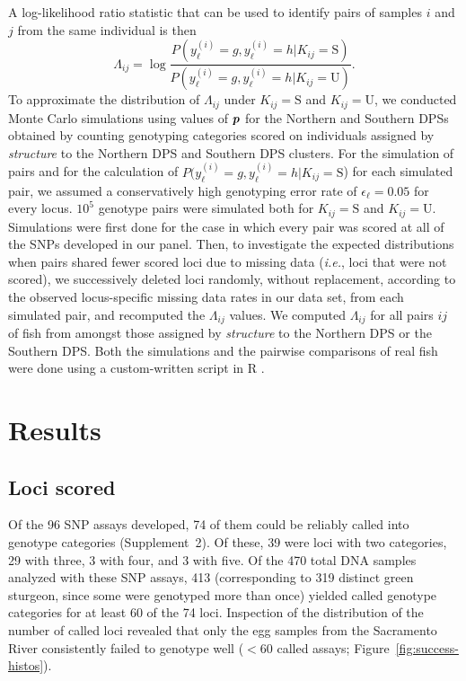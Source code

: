 \documentclass[twocolumn,natbib]{svjour3}       %
\def\bm#1{\mathpalette\bmstyle{#1}}
\def\bmstyle#1#2{\mbox{\boldmath$#1#2$}}
\newcommand{\ie}{{\em i.e.},\xspace }
\newcommand{\bp}{\bm{p}}
\begin{document}
A log-likelihood ratio statistic that can be used to
identify pairs of samples $i$ and $j$ from the same
individual is then
\begin{equation}
\Lambda_{ij}= \log\frac{P(y^{(i)}_\ell = g, y^{(i)}_\ell = h | K_{ij} = \mathrm{S})}
{P(y^{(i)}_\ell = g, y^{(i)}_\ell = h | K_{ij} = \mathrm{U})}.
\label{eq:logl}
\end{equation}
To approximate the distribution of
$\Lambda_{ij}$ under $K_{ij} = \mathrm{S}$ and $K_{ij} = \mathrm{U}$, we
conducted Monte Carlo simulations using values of $\bp$ for the Northern and Southern DPSs obtained
by counting genotyping categories scored on individuals assigned by {\em structure} to
the Northern DPS and Southern DPS
clusters.  For the simulation of pairs and for the calculation
of $P(y^{(i)}_\ell = g, y^{(i)}_\ell = h | K_{ij} = \mathrm{S}$) 
for each simulated pair, we assumed a conservatively high genotyping error rate of
$\epsilon_\ell = 0.05$ for every locus.  
$10^5$ genotype pairs were simulated both for $K_{ij} = \mathrm{S}$ and $K_{ij} = \mathrm{U}$.
Simulations were first done for 
the case in which every pair was scored at all of the SNPs developed in our
panel. Then, to investigate the expected
distributions when pairs shared fewer scored loci due to missing data (\ie loci that were not scored),
we successively deleted loci randomly, without replacement, according to 
the observed locus-specific missing
data rates in our data set, from each simulated pair, and recomputed the $\Lambda_{ij}$ values.
We computed $\Lambda_{ij}$ for all pairs
$ij$ of fish from amongst those assigned by {\em structure} to the
Northern DPS or the Southern DPS\@. Both the
simulations and the pairwise comparisons of real fish were done using a custom-written
script in R \citep{RCore2015}.

\section{Results}

\subsection{Loci scored}

Of the 96 SNP assays developed, 74 of them could be reliably called into
genotype categories (Supplement~2).  Of these, 39 were loci with two 
categories, 29 with
three, 3 with four, and 3 with five. Of the 470 total DNA samples analyzed with
these SNP assays, 413 (corresponding to 319 distinct green sturgeon, since some
were genotyped more than once) yielded called genotype categories for at least 60
of the 74 loci. Inspection of the distribution of the number of called loci
revealed that only the egg samples from the Sacramento River consistently failed
to genotype well ($<$60 called assays; Figure~\ref{fig:success-histos}).
\end{document}
